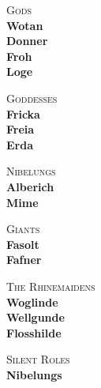 \documentclass[10.5pt,openany]{book}
\begin{document}
\begin{center}
{\small\color{stage}\textsc{Gods}}\\[0.8ex]
\textbf{Wotan}\\[0.3ex]
\textbf{Donner}\\[0.3ex]
\textbf{Froh}\\[0.3ex]
\textbf{Loge}\\[0.3ex]
\par\vspace{1.0ex}
{\small\color{stage}\textsc{Goddesses}}\\[0.8ex]
\textbf{Fricka}\\[0.3ex]
\textbf{Freia}\\[0.3ex]
\textbf{Erda}\\[0.3ex]
\par\vspace{1.0ex}
{\small\color{stage}\textsc{Nibelungs}}\\[0.8ex]
\textbf{Alberich}\\[0.3ex]
\textbf{Mime}\\[0.3ex]
\par\vspace{1.0ex}
{\small\color{stage}\textsc{Giants}}\\[0.8ex]
\textbf{Fasolt}\\[0.3ex]
\textbf{Fafner}\\[0.3ex]
\par\vspace{1.0ex}
{\small\color{stage}\textsc{The Rhinemaidens}}\\[0.8ex]
\textbf{Woglinde}\\[0.3ex]
\textbf{Wellgunde}\\[0.3ex]
\textbf{Flosshilde}\\[0.3ex]
\par\vspace{1.0ex}
{\small\color{stage}\textsc{Silent Roles}}\\[0.8ex]
\textbf{Nibelungs}\\[0.3ex]
\par\vspace{1.0ex}
\end{center}
\end{document}
